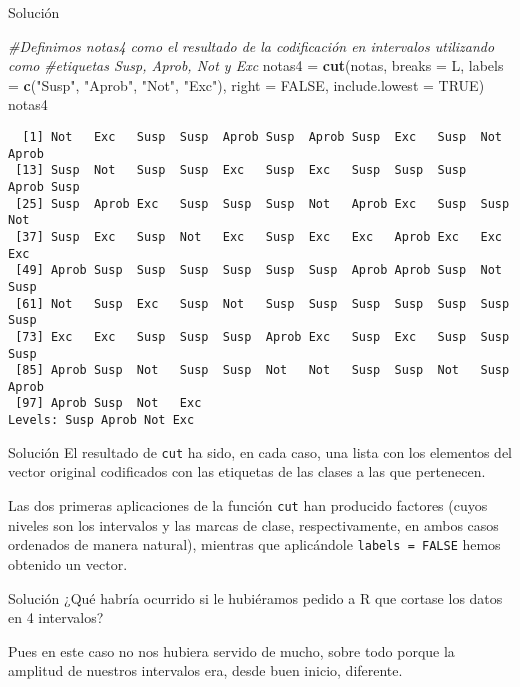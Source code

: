 \documentclass[
  ignorenonframetext,
]{beamer}
\newenvironment{Shaded}{\begin{snugshade}}{\end{snugshade}}
\newcommand{\CommentTok}[1]{\textcolor[rgb]{0.56,0.35,0.01}{\textit{#1}}}
\newcommand{\DataTypeTok}[1]{\textcolor[rgb]{0.13,0.29,0.53}{#1}}
\newcommand{\KeywordTok}[1]{\textcolor[rgb]{0.13,0.29,0.53}{\textbf{#1}}}
\newcommand{\NormalTok}[1]{#1}
\newcommand{\OtherTok}[1]{\textcolor[rgb]{0.56,0.35,0.01}{#1}}
\newcommand{\StringTok}[1]{\textcolor[rgb]{0.31,0.60,0.02}{#1}}
\begin{document}
\begin{frame}[fragile]{Solución}
\protect\hypertarget{soluciuxf3n-20}{}
\begin{Shaded}
\begin{Highlighting}[]
\CommentTok{\#Definimos notas4 como el resultado de la codificación en intervalos utilizando como }
\CommentTok{\#etiquetas Susp, Aprob, Not y Exc}
\NormalTok{notas4 =}\StringTok{ }\KeywordTok{cut}\NormalTok{(notas, }\DataTypeTok{breaks =}\NormalTok{ L, }\DataTypeTok{labels =} \KeywordTok{c}\NormalTok{(}\StringTok{"Susp"}\NormalTok{, }\StringTok{"Aprob"}\NormalTok{, }\StringTok{"Not"}\NormalTok{, }\StringTok{"Exc"}\NormalTok{), }\DataTypeTok{right =} \OtherTok{FALSE}\NormalTok{, }\DataTypeTok{include.lowest =} \OtherTok{TRUE}\NormalTok{)}
\NormalTok{notas4}
\end{Highlighting}
\end{Shaded}

\begin{verbatim}
  [1] Not   Exc   Susp  Susp  Aprob Susp  Aprob Susp  Exc   Susp  Not   Aprob
 [13] Susp  Not   Susp  Susp  Exc   Susp  Exc   Susp  Susp  Susp  Aprob Susp 
 [25] Susp  Aprob Exc   Susp  Susp  Susp  Not   Aprob Exc   Susp  Susp  Not  
 [37] Susp  Exc   Susp  Not   Exc   Susp  Exc   Exc   Aprob Exc   Exc   Exc  
 [49] Aprob Susp  Susp  Susp  Susp  Susp  Susp  Aprob Aprob Susp  Not   Susp 
 [61] Not   Susp  Exc   Susp  Not   Susp  Susp  Susp  Susp  Susp  Susp  Susp 
 [73] Exc   Exc   Susp  Susp  Susp  Aprob Exc   Susp  Exc   Susp  Susp  Susp 
 [85] Aprob Susp  Not   Susp  Susp  Not   Not   Susp  Susp  Not   Susp  Aprob
 [97] Aprob Susp  Not   Exc  
Levels: Susp Aprob Not Exc
\end{verbatim}
\end{frame}

\begin{frame}[fragile]{Solución}
\protect\hypertarget{soluciuxf3n-21}{}
El resultado de \texttt{cut} ha sido, en cada caso, una lista con los
elementos del vector original codificados con las etiquetas de las
clases a las que pertenecen.

Las dos primeras aplicaciones de la función \texttt{cut} han producido
factores (cuyos niveles son los intervalos y las marcas de clase,
respectivamente, en ambos casos ordenados de manera natural), mientras
que aplicándole \texttt{labels\ =\ FALSE} hemos obtenido un vector.
\end{frame}

\begin{frame}{Solución}
\protect\hypertarget{soluciuxf3n-22}{}
¿Qué habría ocurrido si le hubiéramos pedido a R que cortase los datos
en 4 intervalos?

Pues en este caso no nos hubiera servido de mucho, sobre todo porque la
amplitud de nuestros intervalos era, desde buen inicio, diferente.
\end{frame}
\end{document}

